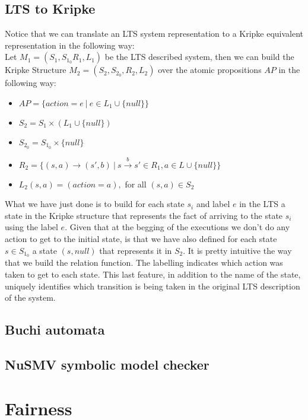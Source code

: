 \documentclass[12pt]{article}
\begin{document}
\subsection{LTS to Kripke}\label{lts2kripke}
Notice that we can translate an LTS system representation to a Kripke equivalent representation in the following way:\\

Let $M_1 = (S_1, S_{1_0} R_1, L_1)$ be the LTS described system, then we can build the Kripke Structure $M_2 = (S_2,S_{2_0},R_2,L_2)$ over the atomic propositions $AP$ in the following way:
\begin{itemize}
\item $ AP = \{action = e ~|~ e \in L_1 \cup \{null\}\} $
\item $ S_2 = S_1 \times (L_1 \cup \{null\}) $
\item $S_{2_0} = S_{1_0} \times \{null\}$
\item $R_2 = \{(s,a) \rightarrow (s',b) ~|~ s\overset{b}{\rightarrow}s' \in R_1, a \in L \cup \{null\}\}$
\item $L_2(s,a) = (action = a),$ for all $(s,a) \in S_2$
\end{itemize}
What we have just done is to build for each state $s_i$ and label $e$ in the LTS a state in the Kripke structure that represents the fact of arriving to the state $s_i$ using the label $e$. Given that at the begging of the executions we don't do any action to get to the initial state, is that we have also defined for each state $s \in S_{1_0}$ a state $(s,null)$ that represents it in $S_2$. It is pretty intuitive the way that we build the relation function. The labelling indicates which action was taken to get to each state. This last feature, in addition to the name of the state, uniquely identifies which transition is being taken in the original LTS description of the system.

\subsection{Buchi automata}\label{buchi}
\subsection{NuSMV symbolic model checker}\label{nusmv}

\section{Fairness}\label{fairness}
\end{document}
